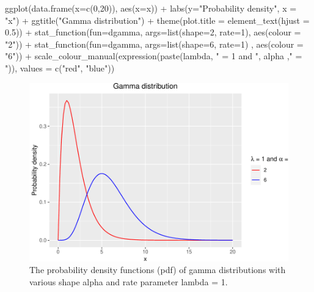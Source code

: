 \documentclass[landscape, 20pt]{extreport}
\newenvironment{Shaded}{\begin{snugshade}}{\end{snugshade}}
\newcommand{\AttributeTok}[1]{\textcolor[rgb]{0.77,0.63,0.00}{#1}}
\newcommand{\DecValTok}[1]{\textcolor[rgb]{0.00,0.00,0.81}{#1}}
\newcommand{\FloatTok}[1]{\textcolor[rgb]{0.00,0.00,0.81}{#1}}
\newcommand{\FunctionTok}[1]{\textcolor[rgb]{0.00,0.00,0.00}{#1}}
\newcommand{\NormalTok}[1]{#1}
\newcommand{\SpecialCharTok}[1]{\textcolor[rgb]{0.00,0.00,0.00}{#1}}
\newcommand{\StringTok}[1]{\textcolor[rgb]{0.31,0.60,0.02}{#1}}
\theoremstyle{definition}
\theoremstyle{definition}
\theoremstyle{definition}
\theoremstyle{definition}
\theoremstyle{remark}
\begin{document}
\begin{Shaded}
\begin{Highlighting}[]
\FunctionTok{ggplot}\NormalTok{(}\FunctionTok{data.frame}\NormalTok{(}\AttributeTok{x=}\FunctionTok{c}\NormalTok{(}\DecValTok{0}\NormalTok{,}\DecValTok{20}\NormalTok{)), }\FunctionTok{aes}\NormalTok{(}\AttributeTok{x=}\NormalTok{x)) }\SpecialCharTok{+}
  \FunctionTok{labs}\NormalTok{(}\AttributeTok{y=}\StringTok{"Probability density"}\NormalTok{, }\AttributeTok{x =} \StringTok{"x"}\NormalTok{) }\SpecialCharTok{+} 
  \FunctionTok{ggtitle}\NormalTok{(}\StringTok{"Gamma distribution"}\NormalTok{)  }\SpecialCharTok{+}
  \FunctionTok{theme}\NormalTok{(}\AttributeTok{plot.title =} \FunctionTok{element\_text}\NormalTok{(}\AttributeTok{hjust =} \FloatTok{0.5}\NormalTok{)) }\SpecialCharTok{+}
  \FunctionTok{stat\_function}\NormalTok{(}\AttributeTok{fun=}\NormalTok{dgamma, }\AttributeTok{args=}\FunctionTok{list}\NormalTok{(}\AttributeTok{shape=}\DecValTok{2}\NormalTok{, }\AttributeTok{rate=}\DecValTok{1}\NormalTok{), }\FunctionTok{aes}\NormalTok{(}\AttributeTok{colour =} \StringTok{"2"}\NormalTok{)) }\SpecialCharTok{+}
  \FunctionTok{stat\_function}\NormalTok{(}\AttributeTok{fun=}\NormalTok{dgamma, }\AttributeTok{args=}\FunctionTok{list}\NormalTok{(}\AttributeTok{shape=}\DecValTok{6}\NormalTok{, }\AttributeTok{rate=}\DecValTok{1}\NormalTok{) , }\FunctionTok{aes}\NormalTok{(}\AttributeTok{colour =} \StringTok{"6"}\NormalTok{)) }\SpecialCharTok{+}
  \FunctionTok{scale\_colour\_manual}\NormalTok{(}\FunctionTok{expression}\NormalTok{(}\FunctionTok{paste}\NormalTok{(lambda, }\StringTok{" = 1 and "}\NormalTok{, alpha ,}\StringTok{" = "}\NormalTok{)), }\AttributeTok{values =} \FunctionTok{c}\NormalTok{(}\StringTok{"red"}\NormalTok{, }\StringTok{"blue"}\NormalTok{))}
\end{Highlighting}
\end{Shaded}

\begin{figure}
\centering
\includegraphics{FigGamma-1.pdf}
\caption{\label{fig:FigGamma}The probability density functions (pdf) of gamma distributions with various shape alpha and rate parameter lambda = 1.}
\end{figure}
\end{document}
